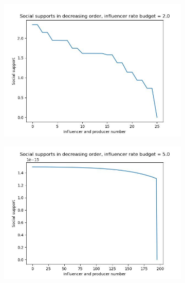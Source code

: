 \documentclass[11pt, letterpaper]{article}
\begin{document}
\begin{figure}[h]
    \centering
\begin{adjustbox}{max width=1.5\textwidth,center}
    \begin{subfigure}[b]{0.45\textwidth}
        \includegraphics[width=\linewidth]{"figures/M_INFL/2.0_supps.jpg"}
    \end{subfigure}
    \begin{subfigure}[b]{0.45\textwidth}
        \includegraphics[width=\linewidth]{"figures/M_INFL/5.0_supps.jpg"}
    \end{subfigure}
    \begin{subfigure}[b]{0.45\textwidth}

\end{subfigure}
\end{adjustbox}
\end{figure}
\end{document}

